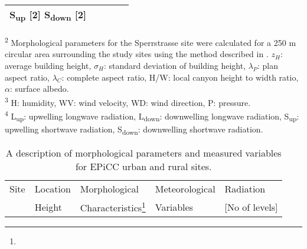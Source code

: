 \begin{bibunit}
\begin{table}[H]
\begin{tabular*}{\textwidth}{p{3.75cm} p{2.25cm}p{3.5cm}p{2.75cm}p{2.75cm}}
		S\textsubscript{up} [2] \newline S\textsubscript{down} [2]  \\ 
		\bottomrule
	\end{tabular*} 
		\raggedright
		\textsuperscript{2} Morphological parameters for the Sperrstrasse site were calculated for a 250 \si{\meter} circular area surrounding the study sites using the method described in \citet{Grimmond1999}. $z_H$: average building height, $\sigma_H $: standard deviation of building height, $\lambda_P $: plan aspect ratio, $\lambda_C $: complete aspect ratio, H/W: local canyon height to width ratio, $\alpha$: surface albedo. \\
		\textsuperscript{3} H: humidity, WV: wind velocity, WD: wind direction, P: pressure. \\
		\textsuperscript{4} L\textsubscript{up}: upwelling longwave radiation, L\textsubscript{down}: downwelling longwave radiation, S\textsubscript{up}: upwelling shortwave radiation, S\textsubscript{down}: downwelling shortwave radiation.
\end{table}

\begin{table}[H]
	\centering
	\caption{A description of morphological parameters and measured variables for EPiCC urban and rural sites.}
	\label{morphepicc}
	\begin{tabular*}{\textwidth}{p{3.75cm} p{2.25cm}p{3.5cm}p{2.75cm}p{2.75cm}}
		\toprule 
		Site & Location & Morphological & Meteorological & Radiation \\ 
		& Height & Characteristics\footnote{} & Variables & [No of levels] \\ 	\midrule
		

\end{tabular*}
\end{table}
\end{bibunit}

